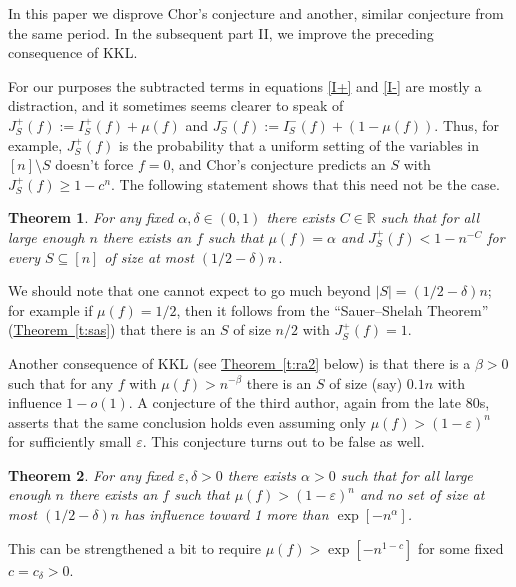\documentclass[11pt]{article}
\numberwithin{equation}{section}
\theoremstyle{definition}
\theoremstyle{plain}
\newcommand{\R}{\mathbb R}
\newcommand{\expref}[2]{\hyperref[#2]{#1~\ref{#2}}}
\newtheorem{thm}{Theorem}[section]
\newcommand{\mn}[0]{\medskip\noindent}
\newcommand{\nin}[0]{\noindent}
\newcommand{\sub}[0]{\subseteq}
\newcommand{\sm}[0]{\setminus}
\newcommand{\0}[0]{\emptyset}
\newcommand{\ga}[0]{\alpha }
\newcommand{\gb}[0]{\beta }
\newcommand{\gd}[0]{\delta }
\newcommand{\eps}[0]{\varepsilon }
\begin{document}
%
In this paper we disprove
Chor's conjecture and another, similar conjecture
from the same period. In the subsequent part II,
we improve the preceding consequence of KKL.

For our purposes the subtracted terms in
equations %
%
\eqref{I+} and
\eqref{I-} are mostly a distraction, and it sometimes seems
clearer to speak of $J^+_S(f):=I^+_S(f)+\mu(f) $
and $J^-_S(f):=I^-_S(f)+(1-\mu(f) )$.
Thus, for example, $J^+_S(f)$ is the probability that
a uniform setting of the variables in $[n]\sm S$
doesn't force $f=0$, and Chor's conjecture predicts
an $S$ with $J^+_S(f)\ge 1-c^n$.
The following statement shows that this need not be the case.

%
\begin{thm}\label{prop1}
For any fixed $\ga,\gd \in (0,1)$
%
there exists $C\in\R$ such that for
all   %
large enough $n$
%
there exists 
%
%
%
%
an    %
$f$ such that  
$\mu(f) =\ga$ and $J_S^+(f)<1-n^{-C}$
for every $S\sub [n]$ of size %
%
at most $(1/2-\gd)n\,.$ 
%
%
\end{thm}

\nin
We should note that one cannot expect to go much
beyond $|S|=(1/2-\gd)n$; for example if $\mu(f)  =1/2$,
then it follows from the ``Sauer--Shelah Theorem''
(\expref{Theorem}{t:sas}) that there is
an $S$ of size $n/2$ with
$J_S^+(f) = 1$.

Another consequence of KKL (see \expref{Theorem}{t:ra2} below)
is that there is a $\gb>0$ such that for any $f$ with $\mu(f) > n^{-\beta}$
there is an $S$ of size (say) $0.1 n$ with influence $1-o(1)$.
A conjecture of the third author, again from
the late 80s, asserts
that the same conclusion holds even assuming only
$\mu(f) > (1-\eps)^n$
for sufficiently small $\eps$.
This conjecture turns out to be false as well.  %


%
\begin{thm}\label{prop2}
For any fixed $\eps, \gd>0$
%
there exists $\ga > 0$ such that for all large enough $n$
%
there exists an $f$ %
%
such that
$\mu(f) > (1-\eps)^n$ and no set of %
%
size at most $(1/2-\gd)n$   %
%
has influence
%
toward   %
1 more than $\exp[-n^\ga]$.
\end{thm}


\mn
This can be strengthened a bit to require
$\mu(f)  > \exp[-n^{1-c}]$ for some fixed $c=c_\gd>0$.
\end{document}
